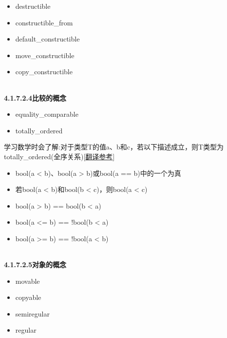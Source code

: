 \begin{itemize}
\item 
destructible

\item 
constructible\_from

\item 
default\_constructible

\item 
move\_constructible

\item 
copy\_constructible
\end{itemize}

\hspace*{\fill} \\ %
\noindent
\textbf{4.1.7.2.4\hspace{0.2cm}比较的概念}

\begin{itemize}
\item 
equality\_comparable

\item 
totally\_ordered
\end{itemize}

学习数学时会了解:对于类型T的值a、b和c，若以下描述成立，则T类型为totally\_ordered(全序关系)[\href{https://zhuanlan.zhihu.com/p/457918701}{翻译参考}]

\begin{itemize}
\item 
bool(a < b)、bool(a > b)或bool(a == b)中的一个为真

\item 
若bool(a < b)和bool(b < c)，则bool(a < c)

\item 
bool(a > b) == bool(b < a)

\item 
bool(a <= b) == !bool(b < a)

\item 
bool(a >= b) == !bool(a < b)
\end{itemize}

\hspace*{\fill} \\ %
\noindent
\textbf{4.1.7.2.5\hspace{0.2cm}对象的概念}

\begin{itemize}
\item 
movable

\item 
copyable

\item 
semiregular

\item 
regular
\end{itemize}

